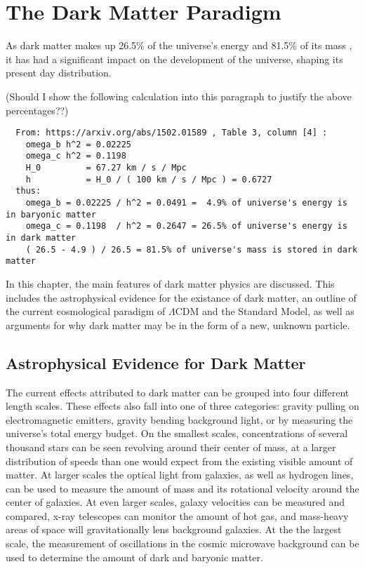 \cleartooddpage[\thispagestyle{empty}]
\chapter{The Dark Matter Paradigm}

  As dark matter makes up 26.5\% of the universe's energy and 81.5\% of its mass \cite{planck2015}, it has had a significant impact on the development of the universe, shaping its present day distribution.

  {\color{red}(Should I show the following calculation into this paragraph to justify the above percentages??)}
  \begin{verbatim}
  From: https://arxiv.org/abs/1502.01589 , Table 3, column [4] :
    omega_b h^2 = 0.02225
    omega_c h^2 = 0.1198
    H_0         = 67.27 km / s / Mpc
    h           = H_0 / ( 100 km / s / Mpc ) = 0.6727
  thus:
    omega_b = 0.02225 / h^2 = 0.0491 =  4.9% of universe's energy is in baryonic matter
    omega_c = 0.1198  / h^2 = 0.2647 = 26.5% of universe's energy is in dark matter
    ( 26.5 - 4.9 ) / 26.5 = 81.5% of universe's mass is stored in dark matter
  \end{verbatim}

  In this chapter, the main features of dark matter physics are discussed.
  This includes the astrophysical evidence for the existance of dark matter, an outline of the current cosmological paradigm of $\Lambda$CDM and the Standard Model, as well as arguments for why dark matter may be in the form of a new, unknown particle.

\section{Astrophysical Evidence for Dark Matter}
  The current effects attributed to dark matter can be grouped into four different length scales.
  These effects also fall into one of three categories: gravity pulling on electromagnetic emitters, gravity bending background light, or by measuring the universe's total energy budget.
  On the smallest scales, concentrations of several thousand stars can be seen revolving around their center of mass, at a larger distribution of speeds than one would expect from the existing visible amount of matter.
  At larger scales the optical light from galaxies, as well as hydrogen lines, can be used to measure the amount of mass and its rotational velocity around the center of galaxies.
  At even larger scales, galaxy velocities can be measured and compared, x-ray telescopes can monitor the amount of hot gas, and mass-heavy areas of space will gravitationally lens background galaxies.
  At the the largest scale, the measurement of oscillations in the cosmic microwave background can be used to determine the amount of dark and baryonic matter.
  
